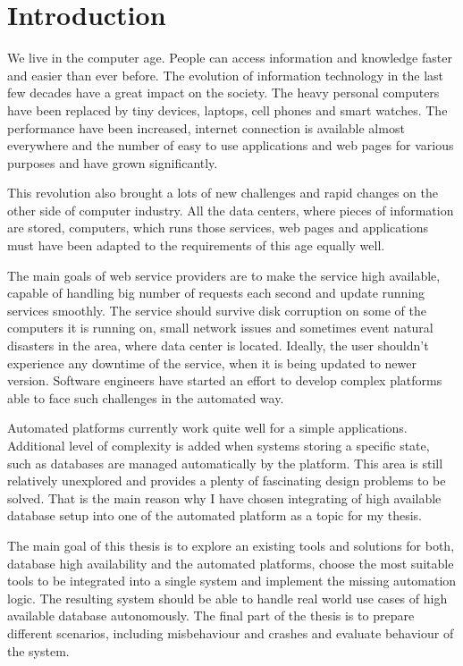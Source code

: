 \documentclass[
  digital, %
  twoside, %
  table,   %
  lof,     %
  lot,     %
]{fithesis3}
\begin{document}
\chapter{Introduction}

We live in the computer age. People can access information and knowledge faster and easier than ever before. The evolution of information technology in the last few decades have a great impact on the society. The heavy personal computers have been replaced by tiny devices, laptops, cell phones and smart watches. The performance have been increased, internet connection is available almost everywhere and the number of easy to use applications and web pages for various purposes and have grown significantly.

This revolution also brought a lots of new challenges and rapid changes on the other side of computer industry. All the data centers, where pieces of information are stored, computers, which runs those services, web pages and applications must have been adapted to the requirements of this age equally well.

The main goals of web service providers are to make the service high available, capable of handling big number of requests each second and update running services smoothly. The service should survive disk corruption on some of the computers it is running on, small network issues and sometimes event natural disasters in the area, where data center is located. Ideally, the user shouldn't experience any downtime of the service, when it is being updated to newer version. Software engineers have started an effort to develop complex platforms able to face such challenges in the automated way.

Automated platforms currently work quite well for a simple applications. Additional level of complexity is added when systems storing a specific state, such as databases are managed automatically by the platform. This area is still relatively unexplored and provides a plenty of fascinating design problems to be solved. That is the main reason why I have chosen integrating of high available database setup into one of the automated platform as a topic for my thesis.

The main goal of this thesis is to explore an existing tools and solutions for both, database high availability and the automated platforms, choose the most suitable tools to be integrated into a single system and implement the missing automation logic. The resulting system should be able to handle real world use cases of high available database autonomously. The final part of the thesis is to prepare different scenarios, including misbehaviour and crashes and evaluate behaviour of the system.
\end{document}
